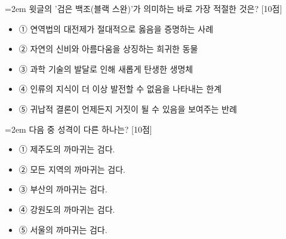 \documentclass[11pt,a4paper]{article}
\newcommand{\qnum}[1]{%
  \tikz[baseline=(num.base)]{%
    \node[circle, fill=numCircle, text=white, inner sep=0pt,
          minimum size=18pt, font=\small\bfseries] (num) {#1};%
  }%
}
\newcommand{\pts}[1]{%
  \hfill\textcolor{ptsBadge}{[#1점]}%
}
\begin{document}
\vspace{4mm}
\begin{minipage}{\columnwidth}
{\hangindent=2em
\qnum{47}\enspace 윗글의 '검은 백조(블랙 스완)'가 의미하는 바로 가장 적절한 것은? \pts{10}
\par}

\vspace{3mm}
\begin{itemize}[leftmargin=2.5em, labelsep=0.3em, label={}, itemsep=4pt, parsep=1pt, topsep=0pt]
  \item ① 연역법의 대전제가 절대적으로 옳음을 증명하는 사례
  \item ② 자연의 신비와 아름다움을 상징하는 희귀한 동물
  \item ③ 과학 기술의 발달로 인해 새롭게 탄생한 생명체
  \item ④ 인류의 지식이 더 이상 발전할 수 없음을 나타내는 한계
  \item ⑤ 귀납적 결론이 언제든지 거짓이 될 수 있음을 보여주는 반례
\end{itemize}
\end{minipage}
\vspace{4mm}

\vspace{4mm}
\begin{minipage}{\columnwidth}
{\hangindent=2em
\qnum{48}\enspace 다음 중 성격이 다른 하나는? \pts{10}
\par}

\vspace{3mm}
\begin{itemize}[leftmargin=2.5em, labelsep=0.3em, label={}, itemsep=4pt, parsep=1pt, topsep=0pt]
  \item ① 제주도의 까마귀는 검다.
  \item ② 모든 지역의 까마귀는 검다.
  \item ③ 부산의 까마귀는 검다.
  \item ④ 강원도의 까마귀는 검다.
  \item ⑤ 서울의 까마귀는 검다.
\end{itemize}
\end{minipage}
\vspace{4mm}
\end{document}
